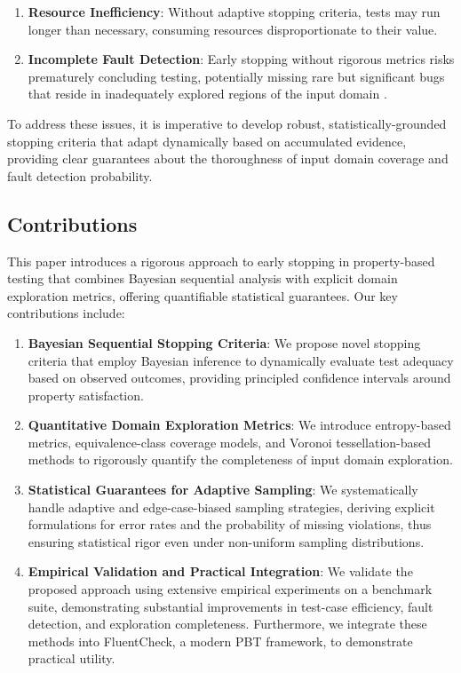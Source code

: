 \begin{enumerate}
    \item \textbf{Resource Inefficiency}: Without adaptive stopping criteria, tests may run longer than necessary, consuming resources disproportionate to their value.
    \item \textbf{Incomplete Fault Detection}: Early stopping without rigorous metrics risks prematurely concluding testing, potentially missing rare but significant bugs that reside in inadequately explored regions of the input domain \cite{Briand2005, Arcuri2013}.
\end{enumerate}

To address these issues, it is imperative to develop robust, statistically-grounded stopping criteria that adapt dynamically based on accumulated evidence, providing clear guarantees about the thoroughness of input domain coverage and fault detection probability.

\subsection{Contributions}
This paper introduces a rigorous approach to early stopping in property-based testing that combines Bayesian sequential analysis with explicit domain exploration metrics, offering quantifiable statistical guarantees. Our key contributions include:

\begin{enumerate}
    \item \textbf{Bayesian Sequential Stopping Criteria}: We propose novel stopping criteria that employ Bayesian inference to dynamically evaluate test adequacy based on observed outcomes, providing principled confidence intervals around property satisfaction.
    \item \textbf{Quantitative Domain Exploration Metrics}: We introduce entropy-based metrics, equivalence-class coverage models, and Voronoi tessellation-based methods to rigorously quantify the completeness of input domain exploration.
    \item \textbf{Statistical Guarantees for Adaptive Sampling}: We systematically handle adaptive and edge-case-biased sampling strategies, deriving explicit formulations for error rates and the probability of missing violations, thus ensuring statistical rigor even under non-uniform sampling distributions.
    \item \textbf{Empirical Validation and Practical Integration}: We validate the proposed approach using extensive empirical experiments on a benchmark suite, demonstrating substantial improvements in test-case efficiency, fault detection, and exploration completeness. Furthermore, we integrate these methods into FluentCheck, a modern PBT framework, to demonstrate practical utility.
\end{enumerate}

